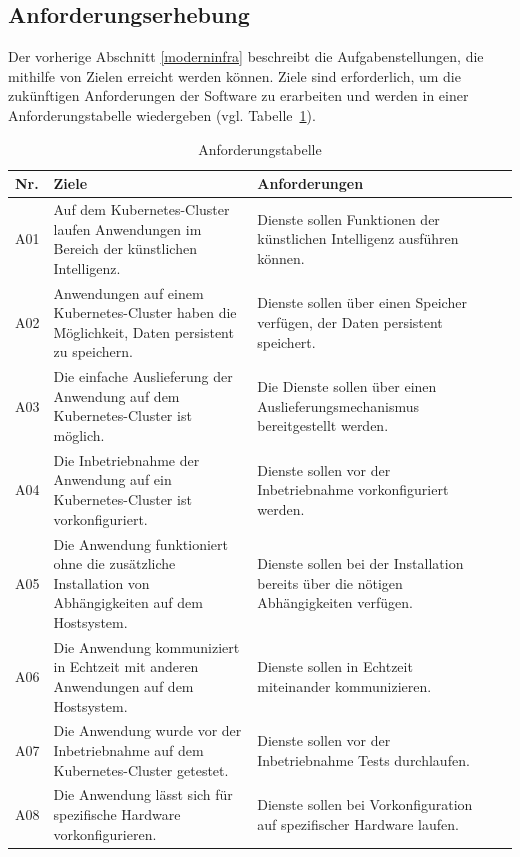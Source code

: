 \subsection{Anforderungserhebung}
Der vorherige Abschnitt \ref{moderninfra} beschreibt die Aufgabenstellungen, die mithilfe von Zielen erreicht werden können. 
Ziele sind erforderlich, um die zukünftigen Anforderungen der Software zu erarbeiten und werden in einer Anforderungstabelle wiedergeben (vgl. Tabelle~\ref{table:Anforderungstabelle}). 

\begin{table}[!htb]
\begin{center}

\begin{tabular}{|p{1cm}|p{6.8cm}|p{6.8cm}|l|l}
    \hline
    \textbf{Nr.} & \textbf{Ziele} & \textbf{Anforderungen} \\
    \hline
    \hypertarget{A01}{A01} 
    & Auf dem Kubernetes-Cluster laufen Anwendungen im Bereich der künstlichen Intelligenz.
    & Dienste sollen Funktionen der künstlichen Intelligenz ausführen können.
    \\
    \hline
    \hypertarget{A02}{A02}
    & Anwendungen auf einem Kubernetes-Cluster haben die Möglichkeit, Daten persistent zu speichern.
    & Dienste sollen über einen Speicher verfügen, der Daten persistent speichert.
    \\
    \hline
    \hypertarget{A03}{A03} 
    & Die einfache Auslieferung der Anwendung auf dem Kubernetes-Cluster ist möglich.
    & Die Dienste sollen über einen Auslieferungsmechanismus bereitgestellt werden.
    \\
    \hline
    \hypertarget{A04}{A04} 
    & Die Inbetriebnahme der Anwendung auf ein Kubernetes-Cluster ist vorkonfiguriert.
    & Dienste sollen vor der Inbetriebnahme vorkonfiguriert werden.
    \\
    \hline
    \hypertarget{A05}{A05} 
    & Die Anwendung funktioniert ohne die zusätzliche Installation von Abhängigkeiten auf dem Hostsystem.
    & Dienste sollen bei der Installation bereits über die nötigen Abhängigkeiten verfügen.
    \\
    \hline
    \hypertarget{A06}{A06} 
    & Die Anwendung kommuniziert in Echtzeit mit anderen Anwendungen auf dem Hostsystem.
    & Dienste sollen in Echtzeit miteinander kommunizieren.
    \\
    \hline
    \hypertarget{A07}{A07} 
    & Die Anwendung wurde vor der Inbetriebnahme auf dem Kubernetes-Cluster getestet.
    & Dienste sollen vor der Inbetriebnahme Tests durchlaufen.
    \\
    \hline
    \hypertarget{A08}{A08} 
    & Die Anwendung lässt sich für spezifische Hardware vorkonfigurieren. 
    & Dienste sollen bei Vorkonfiguration auf spezifischer Hardware laufen.
    \\
    \hline
\end{tabular}
\caption{Anforderungstabelle}
\label{table:Anforderungstabelle}
\end{center}
\end{table}

